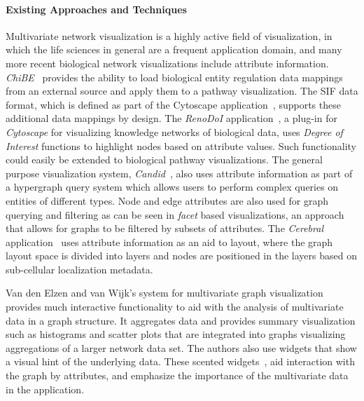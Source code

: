 \documentclass[twocolumn]{bmcart}%
\begin{document}
\paragraph*{Existing Approaches and Techniques}

Multivariate network visualization is a highly active field of visualization, in which the life sciences in general are a frequent application domain, and many more recent biological network visualizations include attribute information.
\textit{ChiBE}~\cite{Babur2010chibe} provides the ability to load biological entity regulation data mappings from an external source and apply them to a pathway visualization.
The SIF data format, which is defined as part of the Cytoscape application~\cite{Shannon2003cytoscape}, supports these additional data mappings by design.
The \textit{RenoDoI} application~\cite{Vehlow2015}, a plug-in for \textit{Cytoscape} for visualizing knowledge networks of biological data, uses \emph{Degree of Interest} functions to highlight nodes based on attribute values.
Such functionality could easily be extended to biological pathway visualizations.
The general purpose visualization system, \textit{Candid}~\cite{Shadoan2013}, also uses attribute information as part of a hypergraph query system which allows users to perform complex queries on entities of different types.
Node and edge attributes are also used for graph querying and filtering as can be seen in \textit{facet} based visualizations, an approach that allows for graphs to be filtered by subsets of attributes.
The \textit{Cerebral} application~\cite{Barsky2008cerebral} uses attribute information as an aid to layout, where the graph layout space is divided into layers and nodes are positioned in the layers based on sub-cellular localization metadata.


Van den Elzen and van Wijk’s \cite{van2014multivariate} system for multivariate graph visualization provides much interactive functionality to aid with the analysis of multivariate data in a graph structure. It aggregates data and provides summary visualization such as histograms and scatter plots that are integrated into graphs visualizing aggregations of a larger network data set. The authors also use widgets that show a visual hint of the underlying data. These scented widgets~\cite{willett2007scented}, aid interaction with the graph by attributes, and emphasize  the importance of the multivariate data in the application.
\end{document}
